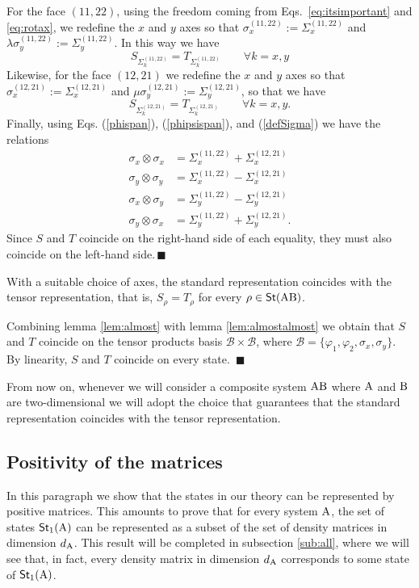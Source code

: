 \documentclass[12pt,aps,pra,showpacs,groupedaddress]{revtex4-1}
\def\Proof{\medskip\par\noindent{\bf Proof. }}
\def\qed{$\,\blacksquare$\par}
\def\rB{{\rm B}}
\def\Stset{{\mathsf{St}}}
\begin{document}
\Proof For the face $(11,22)$, using the freedom coming from
Eqs.~\eqref{eq:itsimportant} and \eqref{eq:rotax}, we redefine the $x$
and $y$ axes so that $\sigma^{(11,22)}_x := \Sigma^{(11,22)}_x$ and
$\lambda \sigma^{(11,22)}_y := \Sigma^{(11,22)}_y$. In this way we have
\begin{equation*}
  S_{\Sigma_k^{(11,22)}} = T_{\Sigma_k^{(11,22)}} \qquad \forall k = x,y
\end{equation*} 
Likewise, for the face $(12,21)$ we redefine the $x$ and $y$ axes so that $\sigma^{(12,21)}_x :=
\Sigma^{(12,21)}_x$ and $\mu\sigma^{(12,21)}_y := \Sigma^{(12,21)}_y$, so that we have
\begin{equation*}
  S_{\Sigma_k^{(12,21)}} = T_{\Sigma_k^{(12,21)}} \qquad \forall k = x,y.
\end{equation*} 
Finally, using Eqs. (\ref{phispan}), (\ref{phipsispan}), and (\ref{defSigma}) we have the relations
\begin{align*}
  \sigma_x \otimes \sigma_x &=  \Sigma^{(11,22)}_x  +  \Sigma_x^{(12,21)}\\
  \sigma_y \otimes \sigma_y &=  \Sigma^{(11,22)}_x  - \Sigma_x^{(12,21)}\\
  \sigma_x \otimes \sigma_y &=  \Sigma^{(11,22)}_y  -  \Sigma_y^{(12,21)}\\
  \sigma_y \otimes \sigma_x &= \Sigma^{(11,22)}_y +
  \Sigma_y^{(12,21)}.
\end{align*}
Since $S$ and $T$ coincide on the right-hand side of each equality, they must also coincide on the
left-hand side.\qed

\begin{theorem}
  With a suitable choice of axes, the standard representation coincides with the
  tensor representation, that is, $S_\rho = T_\rho$ for every $\rho \in\Stset (\rA\rB)$.
  \label{theo:standeqtens}
\end{theorem}
\Proof Combining lemma \ref{lem:almost} with lemma \ref{lem:almostalmost} we obtain that $S$ and $T$
coincide on the tensor products basis $\mathcal B\times \mathcal B$, where $\mathcal B =
\{\varphi_1, \varphi_2, \sigma_x, \sigma_y\}$.  By linearity, $S$ and $T$ coincide on every state.
\qed

From now on, whenever we will consider a composite system $\rA\rB$ where ${\rm A}$ and $\rB$ are
two-dimensional we will adopt the choice that guarantees that the standard
representation coincides with the tensor representation.

 
\subsection{Positivity of the matrices}
In this paragraph we show that the states in our theory can be represented by positive matrices.
This amounts to prove that for every system ${\rm A}$, the set of states $\Stset_1(\rA)$ can be
represented as a subset of the set of density matrices in dimension $d_{\rm A}$.  This result will be
completed in subsection \ref{sub:all}, where we will see that, in fact, every density matrix in
dimension $d_{\rm A}$ corresponds to some state of $\Stset_1 (\rA)$.
\end{document}
